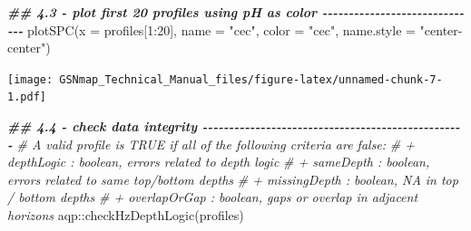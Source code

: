 \documentclass[
  10pt,
  b5paper,
  oneside]{book}
\newenvironment{Shaded}{\begin{snugshade}}{\end{snugshade}}
\newcommand{\AttributeTok}[1]{\textcolor[rgb]{0.77,0.63,0.00}{#1}}
\newcommand{\CommentTok}[1]{\textcolor[rgb]{0.56,0.35,0.01}{\textit{#1}}}
\newcommand{\DecValTok}[1]{\textcolor[rgb]{0.00,0.00,0.81}{#1}}
\newcommand{\DocumentationTok}[1]{\textcolor[rgb]{0.56,0.35,0.01}{\textbf{\textit{#1}}}}
\newcommand{\FunctionTok}[1]{\textcolor[rgb]{0.00,0.00,0.00}{#1}}
\newcommand{\NormalTok}[1]{#1}
\newcommand{\SpecialCharTok}[1]{\textcolor[rgb]{0.00,0.00,0.00}{#1}}
\newcommand{\StringTok}[1]{\textcolor[rgb]{0.31,0.60,0.02}{#1}}
\begin{document}
\begin{Shaded}
\begin{Highlighting}[]
\DocumentationTok{\#\# 4.3 {-} plot first 20 profiles using pH as color {-}{-}{-}{-}{-}{-}{-}{-}{-}{-}{-}{-}{-}{-}{-}{-}{-}{-}{-}{-}{-}{-}{-}{-}{-}{-}{-}{-}{-}{-}}
\FunctionTok{plotSPC}\NormalTok{(}\AttributeTok{x =}\NormalTok{ profiles[}\DecValTok{1}\SpecialCharTok{:}\DecValTok{20}\NormalTok{], }\AttributeTok{name =} \StringTok{"cec"}\NormalTok{, }\AttributeTok{color =} \StringTok{"cec"}\NormalTok{,}
        \AttributeTok{name.style =} \StringTok{"center{-}center"}\NormalTok{)}
\end{Highlighting}
\end{Shaded}

\texttt{[image: GSNmap\_Technical\_Manual\_files/figure-latex/unnamed-chunk-7-1.pdf]}

\begin{Shaded}
\begin{Highlighting}[]
\DocumentationTok{\#\# 4.4 {-} check data integrity {-}{-}{-}{-}{-}{-}{-}{-}{-}{-}{-}{-}{-}{-}{-}{-}{-}{-}{-}{-}{-}{-}{-}{-}{-}{-}{-}{-}{-}{-}{-}{-}{-}{-}{-}{-}{-}{-}{-}{-}{-}{-}{-}{-}{-}{-}{-}{-}{-}{-}}
\CommentTok{\# A valid profile is TRUE if all of the following criteria are false:}
\CommentTok{\#    + depthLogic : boolean, errors related to depth logic}
\CommentTok{\#    + sameDepth : boolean, errors related to same top/bottom depths}
\CommentTok{\#    + missingDepth : boolean, NA in top / bottom depths}
\CommentTok{\#    + overlapOrGap : boolean, gaps or overlap in adjacent horizons}
\NormalTok{aqp}\SpecialCharTok{::}\FunctionTok{checkHzDepthLogic}\NormalTok{(profiles)}
\end{Highlighting}
\end{Shaded}
\end{document}
